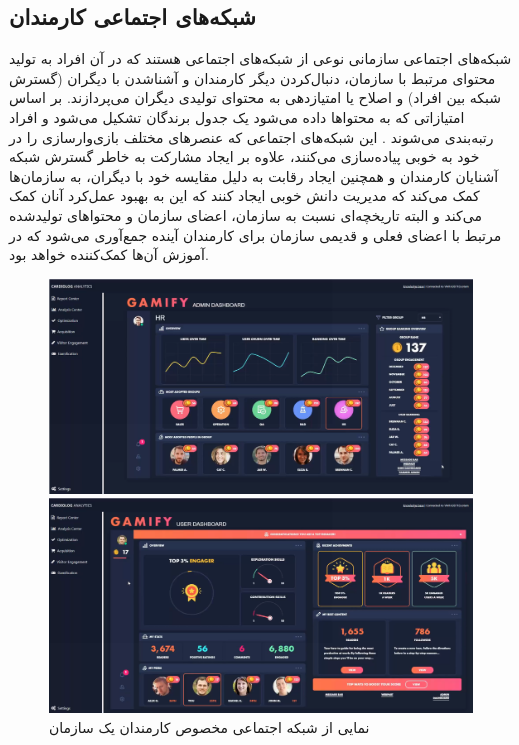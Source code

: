 \subsection{شبکه‌های اجتماعی کارمندان}
\label{sec:socialnetwork}
شبکه‌های اجتماعی سازمانی نوعی از شبکه‌های اجتماعی هستند که در آن افراد به تولید محتوای مرتبط با سازمان، دنبال‌کردن دیگر کارمندان و آشناشدن با دیگران (گسترش شبکه بین افراد) و اصلاح یا امتیازدهی به محتوای تولیدی دیگران می‌پردازند. بر اساس امتیازاتی که به محتواها داده می‌شود یک جدول برندگان تشکیل می‌شود و افراد رتبه‌بندی می‌شوند \cite{sharepoint}.
این شبکه‌های اجتماعی که عنصرهای مختلف بازی‌وارسازی را در خود به خوبی پیاده‌سازی می‌کنند، علاوه بر ایجاد مشارکت به خاطر گسترش شبکه آشنایان کارمندان و همچنین ایجاد رقابت به دلیل مقایسه خود با دیگران، به سازمان‌ها کمک می‌کند که مدیریت دانش خوبی ایجاد کنند که این به بهبود عمل‌کرد آنان کمک می‌کند و البته تاریخچه‌ای نسبت به سازمان، اعضای سازمان و محتواهای تولیدشده مرتبط با اعضای فعلی و قدیمی سازمان برای کارمندان آینده جمع‌آوری می‌شود که در آموزش آن‌ها کمک‌کننده خواهد بود.

\begin{figure}[!htb]
	\centering
	\begin{minipage}[b]{0.49\textwidth}
		\includegraphics[width=\textwidth]{Figures/social1.png}
	\end{minipage}
	\begin{minipage}[b]{0.49\textwidth}
		\includegraphics[width=\textwidth]{Figures/social2.png}
	\end{minipage}
	\caption{نمایی از شبکه اجتماعی مخصوص کارمندان یک سازمان\cite{sharepoint}}
\end{figure}

